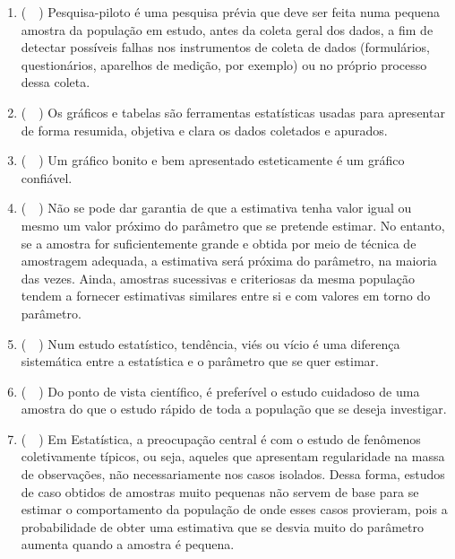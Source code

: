 \begin{enumerate}[label=\emph{\arabic*})]
\begin{enumerate}[label=\emph{\alph*})]
		      \item (~~) Pesquisa-piloto é uma pesquisa prévia que deve ser feita numa pequena amostra da
		            população em estudo, antes da coleta geral dos dados, a fim de detectar possíveis
		            falhas nos instrumentos de coleta de dados (formulários, questionários, aparelhos de
		            medição, por exemplo) ou no próprio processo dessa coleta.

		      \item (~~) Os gráficos e tabelas são ferramentas estatísticas usadas para apresentar de forma
		            resumida, objetiva e clara os dados coletados e apurados.

		      \item (~~) Um gráfico bonito e bem apresentado esteticamente é um gráfico confiável.

		      \item (~~) Não se pode dar garantia de que a estimativa tenha valor igual ou mesmo um valor
		            próximo do parâmetro que se pretende estimar. No entanto, se a amostra for
		            suficientemente grande e obtida por meio de técnica de amostragem adequada, a
		            estimativa será próxima do parâmetro, na maioria das vezes. Ainda, amostras
		            sucessivas e criteriosas da mesma população tendem a fornecer estimativas
		            similares entre si e com valores em torno do parâmetro.

		      \item (~~) Num estudo estatístico, tendência, viés ou vício é uma diferença sistemática entre a
		            estatística e o parâmetro que se quer estimar.

		      \item (~~) Do ponto de vista científico, é preferível o estudo cuidadoso de uma amostra do que
		            o estudo rápido de toda a população que se deseja investigar.

		      \item (~~) Em Estatística, a preocupação central é com o estudo de fenômenos coletivamente
		            típicos, ou seja, aqueles que apresentam regularidade na massa de observações, não
		            necessariamente nos casos isolados. Dessa forma, estudos de caso obtidos de
		            amostras muito pequenas não servem de base para se estimar o comportamento da
		            população de onde esses casos provieram, pois a probabilidade de obter uma
		            estimativa que se desvia muito do parâmetro aumenta quando a amostra é pequena.


\end{enumerate}
\end{enumerate}
